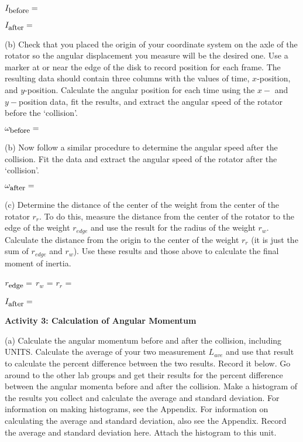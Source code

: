 \( I_{\mbox{\small before}}= \) 
\vspace{5mm}

\( I_{\mbox{\small after}} =\)  
\vspace{5mm}

(b) Check that you placed the origin of your coordinate system on the axle of the
rotator so the angular displacement you measure will be the desired one. 
Use a marker at or near the edge of the disk to record position for each frame. 
The resulting data should contain three columns with the values of time, $x$-position, and $y$-position.
Calculate the angular position for each time using the $x-$ and $y-$position data, fit the results,
and extract the angular speed of the rotator before the `collision'.

\( \omega _{\mbox{\small before}}=\)

\vspace{5mm}

(b) Now follow a similar procedure to determine the angular speed after the collision.
Fit the data and extract the angular speed of the rotator after the `collision'.

\( \omega _{\mbox{\small after}}=\)

\vspace{5mm}

(c) Determine the distance of the center of the weight from the center of the rotator \( r_{r} \). 
To do this, measure the distance from the center
of the rotator to the edge of the weight \( r_{edge} \) and use the result for
the radius of the weight \( r_{w} \). 
Calculate the distance from the origin to the center of the weight \( r_{r} \) (it is just the 
sum of \( r_{edge} \) and \( r_{w} \)). 
Use these results and those above to calculate the final moment of inertia.
\vspace{5mm}

\( r_{\mbox{\small edge}}  =\) \hfill{}\( r_{w} \) = \hfill{}\( r_{r} \) =\hfill{}
\vspace{5mm}

\( I_{\mbox{\small after}} =\)  
\vspace{5mm}

\textbf{Activity  3: Calculation of Angular Momentum}

(a) Calculate the angular momentum before and after the collision, including UNITS. 
Calculate the average of your two measurement $L_{ave}$ and use that result to
calculate the percent difference between the two results. Record it below. 
Go around to the other lab groups and get their results for the percent difference between 
the angular momenta before and after the collision.
Make a histogram of the results you collect and calculate the average and standard deviation.
For information on making histograms, see the Appendix. For information on calculating the average and
standard deviation, also see the Appendix. Record the average and standard deviation here.
Attach the histogram to this unit.
\vspace{5mm}

